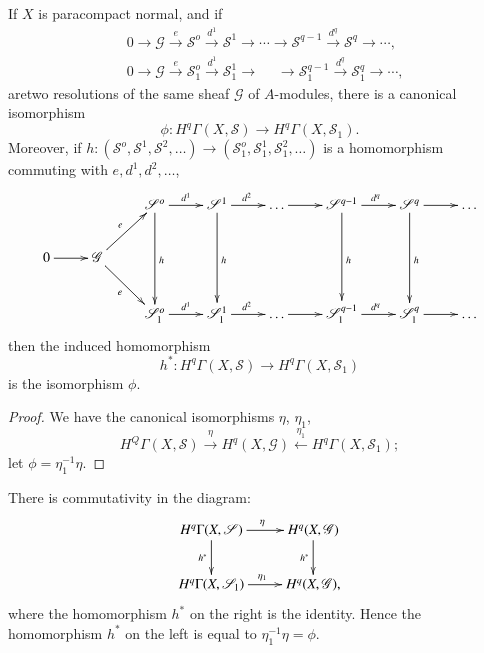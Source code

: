   \begin{thm}%
If $X$ is paracompact normal, and if
\begin{align*}   
&0 \to \mathscr{G} \xrightarrow{e} \mathscr{S}^o
  \xrightarrow{d^1}\mathscr{S}^1 \to \cdots \to \mathscr{S}^{q-1}
  \xrightarrow{d^q} \mathscr{S}^q \to \cdots ,\\ 
&0 \to \mathscr{G} \xrightarrow{e} \mathscr{S}^o_1
  \xrightarrow{d^1}\mathscr{S}^1_1 \to \quad \; \to \mathscr{S}^{q-1}_1
  \xrightarrow{d^q} \mathscr{S}^q_1 \to \cdots ,  
\end{align*}
are\pageoriginale two resolutions of the same sheaf $\mathscr{G}$ of
$A$-modules, there is a canonical isomorphism  
$$
 \phi:H^q \Gamma(X,\mathscr{S})  \to H^q \Gamma(X,\mathscr{S}_1).
$$
Moreover, if $h:(\mathscr{S}^o, \mathscr{S}^1,\mathscr{S}^2, \ldots)
\to (\mathscr{S}^o_1, \mathscr{S}^1_1, \mathscr{S}^2_1, \ldots)$
is a homomorphism commuting with $e, d^1, d^2, \ldots $, 
{\fontsize{9}{11}\selectfont
\[
\xymatrix{
& & \mathscr{S}^o \ar[r]^{d^1} \ar[dd]^h & \mathscr{S}^1
  \ar[r]^{d^2} \ar[dd]^h & \ldots  \ar[r] & \mathscr{S}^{q-1}
  \ar[r]^{d^q}\ar[dd]^h & \mathscr{S}^q\ar[r]\ar[dd]^h & \ldots\\
0 \ar[r] & \mathscr{G} \ar[ur]^e \ar[dr]_e & & &&&&\\
& & \mathscr{S}^o_1 \ar[r]^{d^1} & \mathscr{S}^1_1 \ar[r]^{d^2} &
\ldots \ar[r] & \mathscr{S}^{q-1}_1 \ar[r]^{d^q} & \mathscr{S}^q_1
\ar[r] & \ldots
}
\]}\relax
then the induced homomorphism
$$
h^*: H^q \Gamma (X,\mathscr{S}) \to H^q \Gamma(X,\mathscr{S}_1)
$$
is the isomorphism $\phi$.
  \end{thm}

\begin{proof}
We have the canonical isomorphisms $\eta$, $\eta_1$, 
$$
H^Q \Gamma(X,\mathscr{S}) \xrightarrow{\eta} H^q(X,\mathscr{G})
\xleftarrow{\eta_1} H^q \Gamma (X,\mathscr{S}_1); 
$$
let $\phi= \eta^{-1}_1 \eta$.
\end{proof}

There is commutativity in the diagram:
\[
\xymatrix{
H^q\Gamma(X,\mathscr{S}) \ar[r]^{\eta}\ar[d]_{h^{\ast}} &
H^q(X,\mathscr{G})\ar[d]_{h^{\ast}} \\
H^q\Gamma(X,\mathscr{S}_1) \ar[r]^{\eta_1} & H^q(X,\mathscr{G}),
}
\]
where the homomorphism $h^*$ on the right is the identity. Hence the
homomorphism $h^*$ on the left is equal to $\eta^{-1}_1 \eta =\phi$.  

